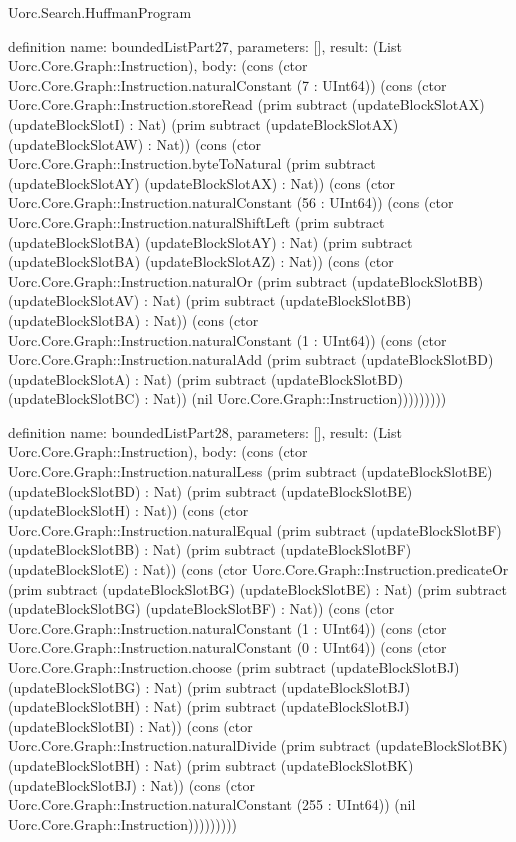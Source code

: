 \begin{lexlean}{Uorc.Search.HuffmanProgram}
\begin{semanticmodule}
definition{
  name: boundedListPart27,
  parameters: [],
  result: (List Uorc.Core.Graph::Instruction),
  body: (cons (ctor Uorc.Core.Graph::Instruction.naturalConstant (7 : UInt64)) (cons (ctor Uorc.Core.Graph::Instruction.storeRead (prim subtract (updateBlockSlotAX) (updateBlockSlotI) : Nat) (prim subtract (updateBlockSlotAX) (updateBlockSlotAW) : Nat)) (cons (ctor Uorc.Core.Graph::Instruction.byteToNatural (prim subtract (updateBlockSlotAY) (updateBlockSlotAX) : Nat)) (cons (ctor Uorc.Core.Graph::Instruction.naturalConstant (56 : UInt64)) (cons (ctor Uorc.Core.Graph::Instruction.naturalShiftLeft (prim subtract (updateBlockSlotBA) (updateBlockSlotAY) : Nat) (prim subtract (updateBlockSlotBA) (updateBlockSlotAZ) : Nat)) (cons (ctor Uorc.Core.Graph::Instruction.naturalOr (prim subtract (updateBlockSlotBB) (updateBlockSlotAV) : Nat) (prim subtract (updateBlockSlotBB) (updateBlockSlotBA) : Nat)) (cons (ctor Uorc.Core.Graph::Instruction.naturalConstant (1 : UInt64)) (cons (ctor Uorc.Core.Graph::Instruction.naturalAdd (prim subtract (updateBlockSlotBD) (updateBlockSlotA) : Nat) (prim subtract (updateBlockSlotBD) (updateBlockSlotBC) : Nat)) (nil Uorc.Core.Graph::Instruction)))))))))
}

definition{
  name: boundedListPart28,
  parameters: [],
  result: (List Uorc.Core.Graph::Instruction),
  body: (cons (ctor Uorc.Core.Graph::Instruction.naturalLess (prim subtract (updateBlockSlotBE) (updateBlockSlotBD) : Nat) (prim subtract (updateBlockSlotBE) (updateBlockSlotH) : Nat)) (cons (ctor Uorc.Core.Graph::Instruction.naturalEqual (prim subtract (updateBlockSlotBF) (updateBlockSlotBB) : Nat) (prim subtract (updateBlockSlotBF) (updateBlockSlotE) : Nat)) (cons (ctor Uorc.Core.Graph::Instruction.predicateOr (prim subtract (updateBlockSlotBG) (updateBlockSlotBE) : Nat) (prim subtract (updateBlockSlotBG) (updateBlockSlotBF) : Nat)) (cons (ctor Uorc.Core.Graph::Instruction.naturalConstant (1 : UInt64)) (cons (ctor Uorc.Core.Graph::Instruction.naturalConstant (0 : UInt64)) (cons (ctor Uorc.Core.Graph::Instruction.choose (prim subtract (updateBlockSlotBJ) (updateBlockSlotBG) : Nat) (prim subtract (updateBlockSlotBJ) (updateBlockSlotBH) : Nat) (prim subtract (updateBlockSlotBJ) (updateBlockSlotBI) : Nat)) (cons (ctor Uorc.Core.Graph::Instruction.naturalDivide (prim subtract (updateBlockSlotBK) (updateBlockSlotBH) : Nat) (prim subtract (updateBlockSlotBK) (updateBlockSlotBJ) : Nat)) (cons (ctor Uorc.Core.Graph::Instruction.naturalConstant (255 : UInt64)) (nil Uorc.Core.Graph::Instruction)))))))))
}


\end{semanticmodule}
\end{lexlean}
